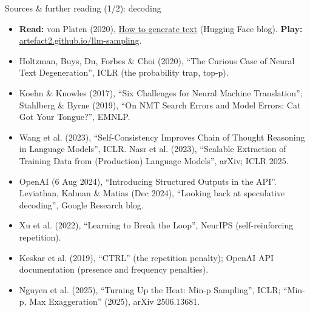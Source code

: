 \documentclass[aspectratio=169]{beamer}
\newcommand{\link}[2]{\href{#1}{\textcolor{popblue}{#2}}}   %
\begin{document}
\begin{frame}{Sources \& further reading (1/2): decoding}
  \scriptsize
  \begin{itemize}
    \item \textbf{Read:} von Platen (2020), \link{https://huggingface.co/blog/how-to-generate}{How
      to generate text} (Hugging Face blog). \textbf{Play:}
      \link{https://artefact2.github.io/llm-sampling/}{artefact2.github.io/llm-sampling}.
    \item Holtzman, Buys, Du, Forbes \& Choi (2020), ``The Curious Case of Neural Text
      Degeneration'', ICLR (the probability trap, top-p).
    \item Koehn \& Knowles (2017), ``Six Challenges for Neural Machine Translation''; Stahlberg \&
      Byrne (2019), ``On NMT Search Errors and Model Errors: Cat Got Your Tongue?'', EMNLP.
    \item Wang et al. (2023), ``Self-Consistency Improves Chain of Thought Reasoning in Language
      Models'', ICLR. Nasr et al. (2023), ``Scalable Extraction of Training Data from (Production)
      Language Models'', arXiv; ICLR 2025.
    \item OpenAI (6 Aug 2024), ``Introducing Structured Outputs in the API''. Leviathan, Kalman \&
      Matias (Dec 2024), ``Looking back at speculative decoding'', Google Research blog.
    \item Xu et al. (2022), ``Learning to Break the Loop'', NeurIPS (self-reinforcing repetition).
    \item Keskar et al. (2019), ``CTRL'' (the repetition penalty); OpenAI API documentation
      (presence and frequency penalties).
    \item Nguyen et al. (2025), ``Turning Up the Heat: Min-p Sampling'', ICLR; ``Min-p, Max
      Exaggeration'' (2025), arXiv 2506.13681.
  \end{itemize}
\end{frame}
\end{document}
